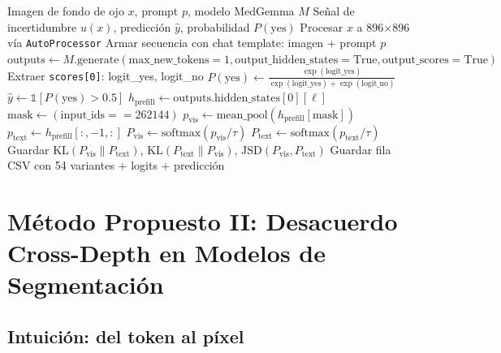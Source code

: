 \documentclass[12pt,a4paper]{article}
\newcommand{\KL}{\mathrm{KL}}
\newcommand{\JSD}{\mathrm{JSD}}
\begin{document}
\begin{algorithm}[H]
\caption{Pipeline de extracción de señal de incertidumbre (Propuesta I)}
\label{alg:pipeline}
\begin{algorithmic}[1]
\Require Imagen de fondo de ojo $x$, prompt $p$, modelo MedGemma $M$
\Ensure Señal de incertidumbre $u(x)$, predicción $\hat{y}$, probabilidad $P(\text{yes})$
\State Procesar $x$ a 896$\times$896 vía \texttt{AutoProcessor}
\State Armar secuencia con chat template: imagen + prompt $p$
\State $\text{outputs} \gets M.\text{generate}(\text{max\_new\_tokens}=1, \text{output\_hidden\_states}=\text{True}, \text{output\_scores}=\text{True})$
\State Extraer \texttt{scores[0]}: logit\_yes, logit\_no
\State $P(\text{yes}) \gets \frac{\exp(\text{logit\_yes})}{\exp(\text{logit\_yes}) + \exp(\text{logit\_no})}$
\State $\hat{y} \gets \mathbb{1}[P(\text{yes}) > 0.5]$
    \State $h_{\text{prefill}} \gets \text{outputs}.\text{hidden\_states}[0][\ell]$  
    \State $\text{mask} \gets (\text{input\_ids} == 262144)$  
    \State $p_{\text{vis}} \gets \text{mean\_pool}(h_{\text{prefill}}[\text{mask}])$
    \State $p_{\text{text}} \gets h_{\text{prefill}}[:, -1, :]$  
        \State $P_{\text{vis}} \gets \text{softmax}(p_{\text{vis}} / \tau)$  
        \State $P_{\text{text}} \gets \text{softmax}(p_{\text{text}} / \tau)$  
        \State Guardar $\KL(P_{\text{vis}} \| P_{\text{text}})$, $\KL(P_{\text{text}} \| P_{\text{vis}})$, $\JSD(P_{\text{vis}}, P_{\text{text}})$
    \EndFor
\EndFor
\State Guardar fila CSV con 54 variantes + logits + predicción
\end{algorithmic}
\end{algorithm}

\section{Método Propuesto II: Desacuerdo Cross-Depth en Modelos de Segmentación}
\label{sec:metodo2}

\subsection{Intuición: del token al píxel}
\end{document}
